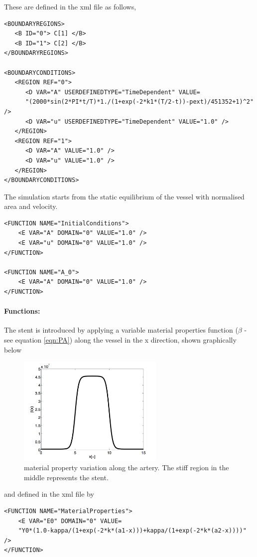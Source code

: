 These are defined in the xml file as follows,
\begin{lstlisting}[style=XMLStyle] 
<BOUNDARYREGIONS>
   <B ID="0"> C[1] </B>
   <B ID="1"> C[2] </B>
</BOUNDARYREGIONS>

<BOUNDARYCONDITIONS>
   <REGION REF="0">
      <D VAR="A" USERDEFINEDTYPE="TimeDependent" VALUE=
      "(2000*sin(2*PI*t/T)*1./(1+exp(-2*k1*(T/2-t))-pext)/451352+1)^2" />
      <D VAR="u" USERDEFINEDTYPE="TimeDependent" VALUE="1.0" />
   </REGION>
   <REGION REF="1">
      <D VAR="A" VALUE="1.0" />
      <D VAR="u" VALUE="1.0" />
   </REGION>
</BOUNDARYCONDITIONS>
\end{lstlisting}

The simulation starts from the static equilibrium of the vessel with normalised area and velocity.
\begin{lstlisting}[style=XMLStyle] 
<FUNCTION NAME="InitialConditions">
	<E VAR="A" DOMAIN="0" VALUE="1.0" />
	<E VAR="u" DOMAIN="0" VALUE="1.0" />
</FUNCTION>
        
<FUNCTION NAME="A_0">
	<E VAR="A" DOMAIN="0" VALUE="1.0" />
</FUNCTION>
\end{lstlisting}

\paragraph{Functions:~} The stent is introduced by applying a variable material properties function ($\beta$ - see equation \ref{eqn:PA}) along the vessel in the x direction, shown graphically below
\begin{figure}
\begin{center}
\includegraphics[width=7cm]{img/StentMaterial.png}
\caption{material property variation along the artery. The stiff region in the middle represents the stent.}
\end{center}
\end{figure}
and defined in the xml file by
\begin{lstlisting}[style=XMLStyle] 
<FUNCTION NAME="MaterialProperties"> 
	<E VAR="E0" DOMAIN="0" VALUE=
	"Y0*(1.0-kappa/(1+exp(-2*k*(a1-x)))+kappa/(1+exp(-2*k*(a2-x))))" />     	
</FUNCTION>
\end{lstlisting}

